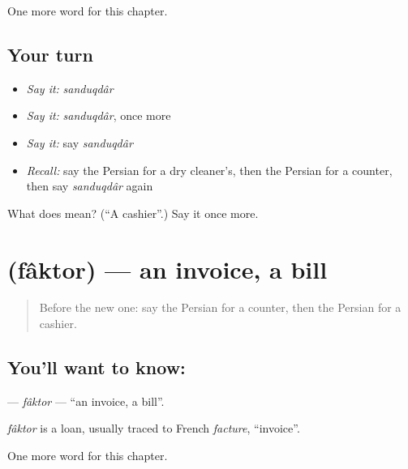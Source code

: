 \begin{grammarlens}[title={What you've built}]
One more word for this chapter.
\end{grammarlens}

\subsection*{Your turn}
\begin{itemize}
\raggedright
  \item \emph{Say it:} \emph{sanduqdâr}
  \item \emph{Say it:} \emph{sanduqdâr}, once more
  \item \emph{Say it:} say \emph{sanduqdâr}
  \item \emph{Recall:} say the Persian for a dry cleaner's, then the Persian for a counter, then say \emph{sanduqdâr} again
\end{itemize}

\begin{tcolorbox}[breakable,colback=teal!4,colframe=teal!35!black,title={Before you move on}]
What does  mean? (\textquotedblleft{}A cashier\textquotedblright{}.) Say it once more.
\end{tcolorbox}
\section[\texorpdfstring{\fa{فاکتور} (fâktor)}{فاکتور (fâktor)}]{ (fâktor) — an invoice, a bill}

\label{lesson:FA-C286-faktor}



\begin{quote}
Before the new one: say the Persian for a counter, then the Persian for a cashier.
\end{quote}

\subsection*{You'll want to know: }
\textbf{} — \emph{fâktor} — \textquotedblleft{}an invoice, a bill\textquotedblright{}.

\begin{cousinweb}
\emph{fâktor} is a loan, usually traced to French \emph{facture}, \textquotedblleft{}invoice\textquotedblright{}.
\end{cousinweb}

\begin{grammarlens}[title={What you've built}]
One more word for this chapter.
\end{grammarlens}

